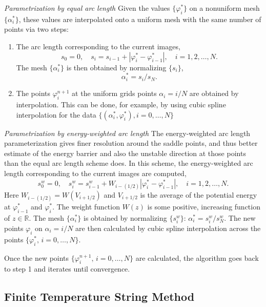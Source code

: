 \emph{Parametrization by equal arc length} Given the values $\{\varphi_i^\ast\}$ on a nonuniform mesh $\{\alpha_i^\ast\}$, these values are interpolated onto a uniform mesh with the same number of points via two steps:
\begin{enumerate}
	\item The arc length corresponding to the current images,
	\begin{equation}
		s_0=0,\quad s_i=s_{i-1}+|\varphi_i^\ast-\varphi_{i-1}^\ast|,\quad i=1,2,\dots,N.
	\end{equation}
	The mesh $\{\alpha_i^\ast\}$ is then obtained by normalizing $\{s_i\}$,
	\begin{equation}
		\alpha_i^\ast=s_i/s_N.
	\end{equation}
	\item The points $\varphi_i^{n+1}$ at the uniform grids points $\alpha_i=i/N$ are obtained by interpolation. This can be done, for example, by using cubic spline interpolation for the data $\{(\alpha_i^\ast,\varphi_i^{\ast}),i=0,\dots,N\}$
\end{enumerate}

\emph{Parametrization by energy-weighted arc length} The energy-weighted arc length parameterization gives finer resolution around the saddle points, and thus better estimate of the energy barrier and also the unstable direction at those points than the equal arc length scheme does. In this scheme, the energy-weighted arc length corresponding to the current images are computed,
\begin{equation}
	s_0^w=0,\quad s_i^w=s_{i-1}^w+W_{i-(1/2)}|\varphi_i^\ast-\varphi_{i-1}^\ast|,\quad i=1,2,\dots,N.
\end{equation}
Here $W_{i-(1/2)}=W(V_{i+1/2})$ and $V_{i+1/2}$ is the average of the potential energy at $\varphi_{i-1}^\ast$ and $\varphi_{i}^\ast$. The weight function $W(z)$ is some positive, increasing function of $z\in \mathbb{R}$. The mesh $\{\alpha_i^\ast\}$ is obtained by normalizing $\{s_i^w\}:\,\alpha_i^\ast=s_i^w/s_N^w$. The new points $\varphi_i$ on $\alpha_i=i/N$ are then calculated by cubic spline interpolation across the points $\{\varphi_i^\ast,\,i=0,\dots,N\}$.

Once the new points $\{\varphi_i^{n+1},\,i=0,\dots,N\}$ are calculated, the algorithm goes back to step 1 and iterates until convergence.

\subsection{Finite Temperature String Method\label{Sec:ES:string:FTS}}
